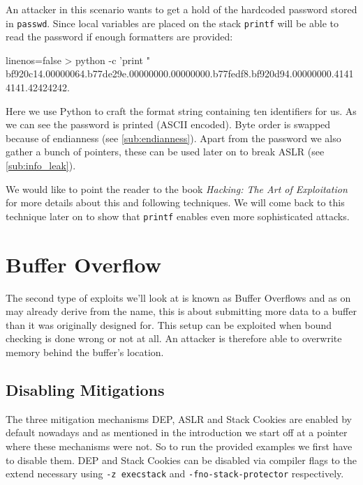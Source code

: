 \documentclass[article]{uibk}
\begin{document}
An attacker in this scenario wants to get a hold of the hardcoded password
stored in \texttt{passwd}. Since local variables are placed on the stack
\texttt{printf} will be able to read the password if enough formatters are
provided:

\begin{code*}{linenos=false}
    > python -c 'print "%
    bf920c14.00000064.b77de29e.00000000.00000000.b77fedf8.bf920d94.00000000.41414141.42424242.
\end{code*}

Here we use Python to craft the format string containing ten identifiers for
us. As we can see the password is printed (ASCII encoded). Byte order is
swapped because of endianness (see \cref{sub:endianness}). Apart from the
password we also gather a bunch of pointers, these can be used later on to
break ASLR (see \cref{sub:info_leak}).

We would like to point the reader to the book \textit{Hacking: The Art of
Exploitation}~\cite[pp.~167]{art_of_exploitation} for more details about this
and following techniques. We will come back to this technique later on to show
that \texttt{printf} enables even more sophisticated attacks.

\section{Buffer Overflow}
\label{sec:buffer_overflow}

The second type of exploits we'll look at is known as Buffer Overflows and as
on may already derive from the name, this is about submitting more data to a
buffer than it was originally designed for. This setup can be exploited when
bound checking is done wrong or not at all. An attacker is therefore able to
overwrite memory behind the buffer's location.

\subsection{Disabling Mitigations}

The three mitigation mechanisms DEP, ASLR and Stack Cookies are enabled by
default nowadays and as mentioned in the introduction we start off at a pointer
where these mechanisms were not. So to run the provided examples we first have
to disable them. DEP and Stack Cookies can be disabled via compiler flags to
the extend necessary using \texttt{-z execstack} and
\texttt{-fno-stack-protector} respectively.
\end{document}
